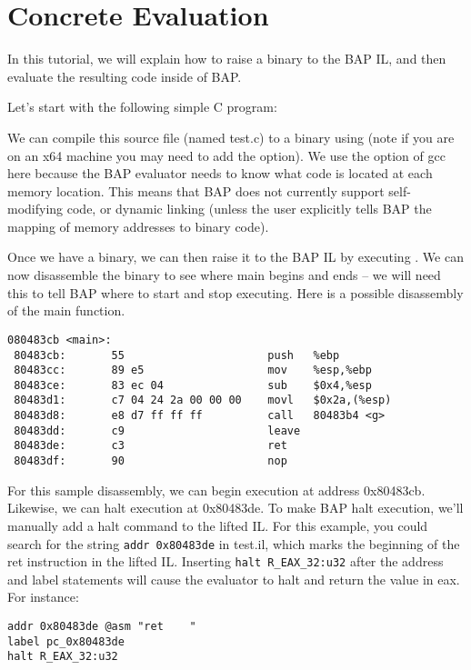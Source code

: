\section{Concrete Evaluation}

In this tutorial, we will explain how to raise a binary to the BAP IL,
and then evaluate the resulting code inside of BAP.

Let's start with the following simple C program:


We can compile this source file (named test.c) to a binary using
 (note if you are on an x64 machine you may
need to add the  option).  We use the  option of
gcc here because the BAP evaluator needs to know what code is located
at each memory location. This means that BAP does not currently
support self-modifying code, or dynamic linking (unless the user
explicitly tells BAP the mapping of memory addresses to binary code).

Once we have a binary, we can then raise it to the BAP IL by executing
. We can now disassemble the binary
to see where main begins and ends -- we will need this to tell BAP
where to start and stop executing. Here is a possible disassembly of
the main function.

\begin{verbatim}
080483cb <main>:
 80483cb:       55                      push   %ebp
 80483cc:       89 e5                   mov    %esp,%ebp
 80483ce:       83 ec 04                sub    $0x4,%esp
 80483d1:       c7 04 24 2a 00 00 00    movl   $0x2a,(%esp)
 80483d8:       e8 d7 ff ff ff          call   80483b4 <g>
 80483dd:       c9                      leave  
 80483de:       c3                      ret    
 80483df:       90                      nop
\end{verbatim}

For this sample disassembly, we can begin execution at address
0x80483cb.  Likewise, we can halt execution at 0x80483de.  To make BAP
halt execution, we'll manually add a halt command to the lifted IL.
For this example, you could search for the string
\verb!addr 0x80483de! in test.il, which marks the beginning of the ret
instruction in the lifted IL.  Inserting \verb!halt R_EAX_32:u32!
after the address and label statements will cause the evaluator to
halt and return the value in eax.  For instance:

\begin{verbatim}
addr 0x80483de @asm "ret    "
label pc_0x80483de
halt R_EAX_32:u32
\end{verbatim}


